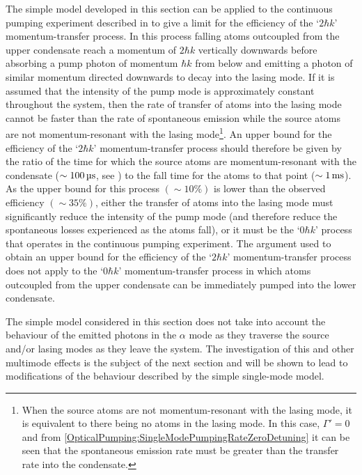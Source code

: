 \parasep

The simple model developed in this section can be applied to the continuous pumping experiment described in  to give a limit for the efficiency of the `$2 \hbar k$' momentum-transfer process.  In this process falling atoms outcoupled from the upper condensate reach a momentum of $2\hbar k$ vertically downwards before absorbing a pump photon of momentum $\hbar k$ from below and emitting a photon of similar momentum directed downwards to decay into the lasing mode.  If it is assumed that the intensity of the pump mode is approximately constant throughout the system, then the rate of transfer of atoms into the lasing mode cannot be faster than the rate of spontaneous emission while the source atoms are not momentum-resonant with the lasing mode\footnote{When the source atoms are not momentum-resonant with the lasing mode, it is equivalent to there being no atoms in the lasing mode.  In this case, $\Gamma'=0$ and from \eqref{OpticalPumping:SingleModePumpingRateZeroDetuning} it can be seen that the spontaneous emission rate must be greater than the transfer rate into the condensate.}.  An upper bound for the efficiency of the `$2 \hbar k$' momentum-transfer process should therefore be given by the ratio of the time for which the source atoms are momentum-resonant with the condensate ($\sim\unit[100]{\micro s}$, see ) to the fall time for the atoms to that point ($\sim\unit[1]{ms}$).  As the upper bound for this process $(\sim 10\%)$ is lower than the observed efficiency $(\sim 35\%)$, either the transfer of atoms into the lasing mode must significantly reduce the intensity of the pump mode (and therefore reduce the spontaneous losses experienced as the atoms fall), or it must be the `$0 \hbar k$' process that operates in the continuous pumping experiment.  The argument used to obtain an upper bound for the efficiency of the `$2 \hbar k$' momentum-transfer process does not apply to the `$0 \hbar k$' momentum-transfer process in which atoms outcoupled from the upper condensate can be immediately pumped into the lower condensate.

The simple model considered in this section does not take into account the behaviour of the emitted photons in the $\alpha$ mode as they traverse the source and/or lasing modes as they leave the system.  The investigation of this and other multimode effects is the subject of the next section and will be shown to lead to modifications of the behaviour described by the simple single-mode model.

